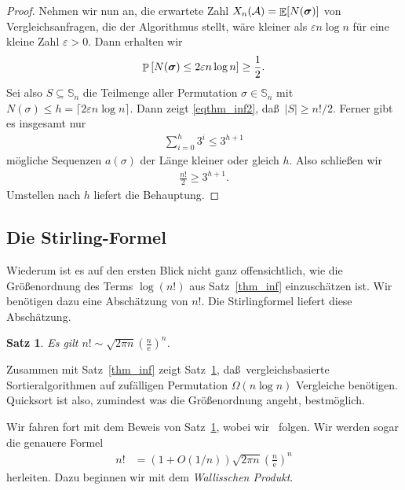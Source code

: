 \documentclass[10pt,reqno]{amsart}
\numberwithin{equation}{section}
\renewcommand\subset{\subseteq}
\newcommand\cA{\mathcal A}
\renewcommand\SS{\mathbb S}
\def\vec#1{\mathchoice{\mbox{\boldmath$\displaystyle#1$}}
{\mbox{\boldmath$\textstyle#1$}}
{\mbox{\boldmath$\scriptstyle#1$}}
{\mbox{\boldmath$\scriptscriptstyle#1$}}}
\DeclareMathOperator{\ex}{\mathbb E}
\DeclareMathOperator{\pr}{\mathbb P}
\newtheorem{theorem}[definition]{Satz}
\newcommand\eul{\mathrm{e}}
\newcommand\eps{\varepsilon}
\newcommand\bc[1]{\left({#1}\right)}
\newcommand\bcfr[2]{\bc{\frac{#1}{#2}}}
\newcommand\brk[1]{\left\lbrack{#1}\right\rbrack}
\newcommand\Thm{Satz}
\begin{document}
\begin{proof}
	Nehmen wir nun an, die erwartete Zahl $X_n(\cA)=\ex[N(\vec\sigma)]$ von Vergleichsanfragen, die der Algorithmus stellt, w\"are kleiner als $\eps n\log n$ f\"ur eine kleine Zahl $\eps>0$.
	Dann erhalten wir
	\begin{align}\label{eqthm_inf2}
		\pr\brk{N(\vec\sigma)\leq2\eps n\log n}\geq\frac12.
	\end{align}
	Sei also $S\subset\SS_n$ die Teilmenge aller Permutation $\sigma\in\SS_n$ mit $N(\sigma)\leq h=\lceil 2\eps n\log n\rceil$.
	Dann zeigt \eqref{eqthm_inf2}, da\ss\ $|S|\geq n!/2$.
	Ferner gibt es insgesamt nur 
	\begin{align*}
		\sum_{i=0}^h3^i\leq 3^{h+1}
	\end{align*}
	m\"ogliche Sequenzen $a(\sigma)$ der L\"ange kleiner oder gleich $h$.
	Also schlie\ss en wir
	\begin{align*}
		\frac{n!}2\geq 3^{h+1}.
	\end{align*}
	Umstellen nach $h$ liefert die Behauptung.
\end{proof}

\subsection{Die Stirling-Formel}\label{sec_stirling}
Wiederum ist es auf den ersten Blick nicht ganz offensichtlich, wie die Gr\"o\ss enordnung des Terms $\log(n!)$ aus \Thm~\ref{thm_inf} einzusch\"atzen ist.
Wir ben\"otigen dazu eine Absch\"atzung von $n!$.
Die Stirlingformel liefert diese Absch\"atzung.

\begin{theorem}\label{thm_stirling}
	Es gilt $n!\sim\sqrt{2\pi n}\bcfr n\eul^n$.
\end{theorem}

Zusammen mit \Thm~\ref{thm_inf} zeigt \Thm~\ref{thm_stirling}, da\ss\ vergleichsbasierte Sortieralgorithmen auf zuf\"alligen Permutation $\Omega(n\log n)$ Vergleiche ben\"otigen.
Quicksort ist also, zumindest was die Gr\"o\ss enordnung angeht, bestm\"oglich.

Wir fahren fort mit dem Beweis von \Thm~\ref{thm_stirling}, wobei wir~\cite{Lang} folgen.
Wir werden sogar die genauere Formel
\begin{align*}
	n!&=(1+O(1/n))\sqrt{2\pi n}\bcfr n\eul^n
\end{align*}
herleiten.
Dazu beginnen wir mit dem {\em Wallisschen Produkt}.
\end{document}
